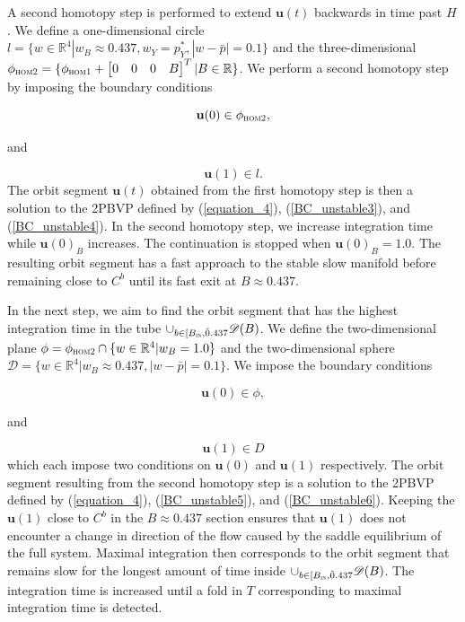 \documentclass{ws-ijbc}
\begin{document}
A second homotopy step is performed to extend $\mathbf{u}(t)$ backwards in time past $H$.  We define a one-dimensional circle $l = \{w \in \mathbb{R}^4 | w_B \approx 0.437, w_Y =p^*_Y, |w-\bar{p}| = 0.1\}$ and the three-dimensional $\phi_{\textsc{hom2}} = \{\phi_{\textsc{hom1}} + \begin{bmatrix} 0 & 0 & 0 & B \end{bmatrix}^{T}| B \in \mathbb{R} \}$.  We perform a second homotopy step by imposing the boundary conditions

\begin{equation}
\mathbf{u}(0) \in \phi_{\textsc{hom2}},
\label{BC_unstable3}
\end{equation}

and

\begin{equation}
\mathbf{u}(1) \in l.
\label{BC_unstable4}
\end{equation}
\noindent
The orbit segment $\mathbf{u}(t)$ obtained from the first homotopy step is then a solution to the 2PBVP defined by (\ref{equation_4}), (\ref{BC_unstable3}), and (\ref{BC_unstable4}).  In the second homotopy step, we increase integration time while $\mathbf{u}(0)_B$ increases.  The continuation is stopped when $\mathbf{u}(0)_B=1.0$.  The resulting orbit segment has a fast approach to the stable slow manifold before remaining close to $C^b$ until its fast exit at $B \approx 0.437$.  

In the next step, we aim to find the orbit segment that has the highest integration time in the tube $\cup_{b\in[B_{\textsc{in}}, \tilde 0.437} \mathscr{D}(B)$.  We define the two-dimensional plane $\phi = \phi_{\textsc{hom2}} \cap \{w \in \mathbb{R}^4 | w_B=1.0 \}$ and the two-dimensional sphere  $\mathscr{D} = \{w \in \mathbb{R}^4 | w_B \approx 0.437, |w-\bar{p}| = 0.1\}$.  We impose the boundary conditions

\begin{equation}
\mathbf{u}(0) \in \phi,
\label{BC_unstable5}
\end{equation}

and

\begin{equation}
\mathbf{u}(1) \in D
\label{BC_unstable6}
\end{equation}
\noindent
which each impose two conditions on $\mathbf{u}(0)$ and $\mathbf{u}(1)$ respectively.  The orbit segment resulting from the second homotopy step is a solution to the 2PBVP defined by (\ref{equation_4}), (\ref{BC_unstable5}), and (\ref{BC_unstable6}).  Keeping the $\mathbf{u}(1)$ close to $C^b$ in the $B \approx 0.437$ section ensures that $\mathbf{u}(1)$ does not encounter a change in direction of the flow caused by the saddle equilibrium of the full system.  Maximal integration then corresponds to the orbit segment that remains slow for the longest amount of time inside $\cup_{b\in[B_{\textsc{in}}, \tilde 0.437} \mathscr{D}(B)$.  The integration time is increased until a fold in $T$ corresponding to maximal integration time is detected.
\end{document}
